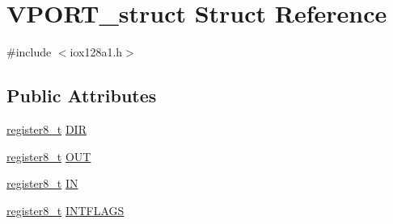 \hypertarget{struct_v_p_o_r_t__struct}{
\section{VPORT\_\-struct Struct Reference}
\label{struct_v_p_o_r_t__struct}
}


{\ttfamily \#include $<$iox128a1.h$>$}

\subsection*{Public Attributes}
\begin{DoxyCompactItemize}
\item 
\hyperlink{iox128a1_8h_a6a0649252b392263406882923b04a9db}{register8\_\-t} \hyperlink{struct_v_p_o_r_t__struct_ae8fe5e80d081564b68412bc3546180ec}{DIR}
\item 
\hyperlink{iox128a1_8h_a6a0649252b392263406882923b04a9db}{register8\_\-t} \hyperlink{struct_v_p_o_r_t__struct_af1e9d35b409cae9317ca4efe44736ec4}{OUT}
\item 
\hyperlink{iox128a1_8h_a6a0649252b392263406882923b04a9db}{register8\_\-t} \hyperlink{struct_v_p_o_r_t__struct_ad0328b64874040f2c48ac748291584e0}{IN}
\item 
\hyperlink{iox128a1_8h_a6a0649252b392263406882923b04a9db}{register8\_\-t} \hyperlink{struct_v_p_o_r_t__struct_a808c432620513ead0ca8dc127715e24b}{INTFLAGS}
\end{DoxyCompactItemize}


